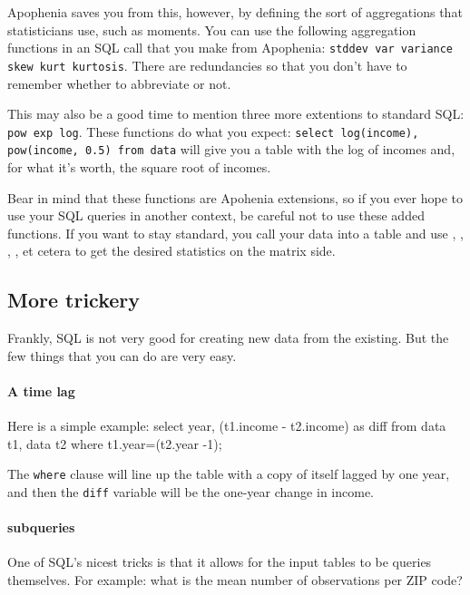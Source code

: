 Apophenia saves you from this, however, by defining the sort of
aggregations that statisticians use, such as moments. You can use the
following aggregation functions in an SQL call that you make from
Apophenia: {\tt stddev var variance skew kurt kurtosis}. There are
redundancies so that you don't have to remember whether to abbreviate or
not.

This may also be a good time to mention three more extentions to
standard SQL: {\tt pow exp log}. These functions do what you
expect: {\tt select log(income), pow(income, 0.5) from data} will give
you a table with the log of incomes and, for what it's worth, the square root of incomes.

Bear in mind that these functions are Apohenia extensions, so if you
ever hope to use your SQL queries in another context, be careful not to
use these added functions. If you want to stay standard,
you call your data into a table and 
use , ,
, , et cetera to get the desired
statistics on the matrix side.

\subsection{More trickery} Frankly, SQL is not very good for
creating new data from the existing. But the few things that you can do
are very easy.

\paragraph{A time lag} Here is a simple example:
select year, (t1.income - t2.income) as diff
   from data t1, data t2
   where t1.year=(t2.year -1);

The {\tt where} clause will line up the table with a copy of itself
lagged by one year, and then the {\tt diff} variable will be the
one-year change in income.


\paragraph{subqueries}

One of SQL's nicest tricks is that it allows for the input tables to be
queries themselves. For example: what is the mean number of observations per
ZIP code?

